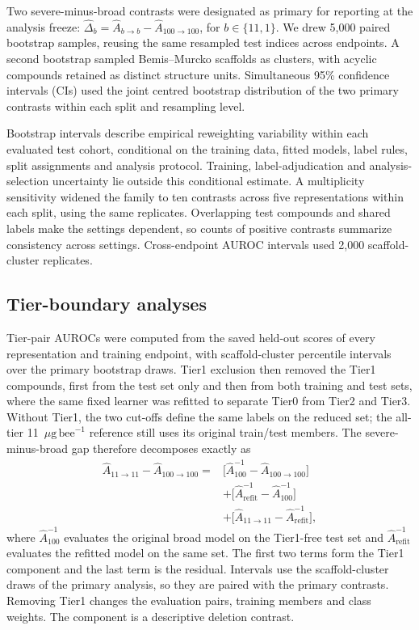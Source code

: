 \documentclass{ieeeaccess}
\newcommand{\ugbee}{\ensuremath{\mu\mathrm{g\,bee}^{-1}}\xspace}
\begin{document}
Two severe-minus-broad contrasts were designated as primary for reporting at the analysis freeze: \(\widehat\Delta_b=\widehat A_{b\to b}-\widehat A_{100\to100}\), for \(b\in\{11,1\}\). We drew 5,000 paired bootstrap samples, reusing the same resampled test indices across endpoints. A second bootstrap sampled Bemis--Murcko scaffolds\cite{Bemis1996} as clusters, with acyclic compounds retained as distinct structure units. Simultaneous 95\% confidence intervals (CIs) used the joint centred bootstrap distribution of the two primary contrasts within each split and resampling level.

Bootstrap intervals describe empirical reweighting variability within each evaluated test cohort, conditional on the training data, fitted models, label rules, split assignments and analysis protocol. Training, label-adjudication and analysis-selection uncertainty lie outside this conditional estimate. A multiplicity sensitivity widened the family to ten contrasts across five representations within each split, using the same replicates. Overlapping test compounds and shared labels make the settings dependent, so counts of positive contrasts summarize consistency across settings. Cross-endpoint AUROC intervals used 2,000 scaffold-cluster replicates.

\subsection{Tier-boundary analyses}
\label{sec:tier-methods}
Tier-pair AUROCs were computed from the saved held-out scores of every representation and training endpoint, with scaffold-cluster percentile intervals over the primary bootstrap draws. Tier1 exclusion then removed the Tier1 compounds, first from the test set only and then from both training and test sets, where the same fixed learner was refitted to separate Tier0 from Tier2 and Tier3. Without Tier1, the two cut-offs define the same labels on the reduced set; the all-tier 11~\ugbee reference still uses its original train/test members. The severe-minus-broad gap therefore decomposes exactly as
\begin{equation}
\begin{aligned}
\widehat A_{11\to11}-\widehat A_{100\to100}
={}&\bigl[\widehat A^{-1}_{100}-\widehat A_{100\to100}\bigr]\\
&+\bigl[\widehat A^{-1}_{\mathrm{refit}}-\widehat A^{-1}_{100}\bigr]\\
&+\bigl[\widehat A_{11\to11}-\widehat A^{-1}_{\mathrm{refit}}\bigr],
\end{aligned}
\label{eq:tier1-decomposition}
\end{equation}
where \(\widehat A^{-1}_{100}\) evaluates the original broad model on the Tier1-free test set and \(\widehat A^{-1}_{\mathrm{refit}}\) evaluates the refitted model on the same set. The first two terms form the Tier1 component and the last term is the residual. Intervals use the scaffold-cluster draws of the primary analysis, so they are paired with the primary contrasts. Removing Tier1 changes the evaluation pairs, training members and class weights. The component is a descriptive deletion contrast.
\end{document}
